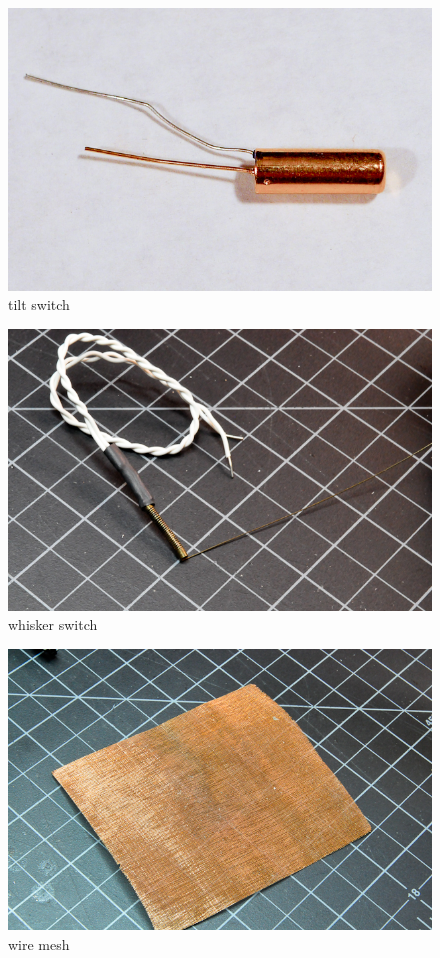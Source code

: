 \begin{figure}[!htb]
 \centering
 \includegraphics[scale=0.3]{img/switches/tilt_switch.jpg}
 \caption{tilt switch}
 \label{tilt switch}
\end{figure}





\begin{figure}[!htb]
 \centering
 \includegraphics[scale=0.3]{img/switches/whisker_switch.jpg}
 \caption{whisker switch}
 \label{whisker switch}
\end{figure}


\begin{figure}[!htb]
 \centering
 \includegraphics[scale=0.3]{img/switches/wire_mesh.jpg}
 \caption{wire mesh}
 \label{wire mesh}
\end{figure}


